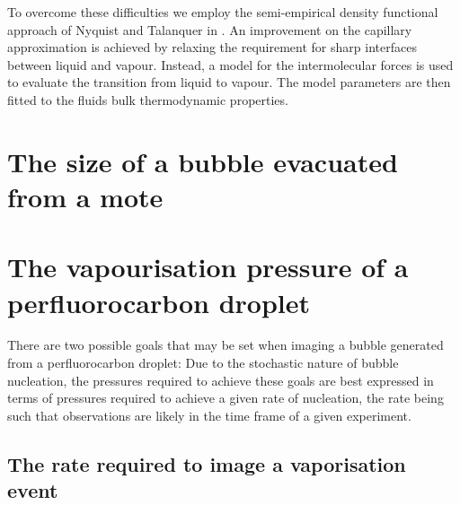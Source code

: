 To overcome these difficulties we employ the semi-empirical density functional approach of Nyquist\cite{Nyquist1995} and Talanquer\cite{Talanquer2001} in .
An improvement on the capillary approximation is achieved by  relaxing
the requirement for sharp interfaces between liquid and vapour.
Instead, a model for the intermolecular forces is used to evaluate the transition from liquid to vapour.
The model parameters are then fitted to the fluids bulk thermodynamic properties.



\section{The size of a bubble evacuated from a mote}\label{sec:nuc:evacuate}


\section{The vapourisation pressure of a perfluorocarbon droplet}\label{sec:nuc:vapourise}

There are two possible goals that may be set 
when imaging a bubble generated from a perfluorocarbon droplet:
Due to the stochastic nature of bubble nucleation, 
the pressures required to achieve these goals are best expressed in terms of pressures required
to achieve a given rate of nucleation,
the rate being such that observations are likely in the time frame of a given experiment.


\subsection{The rate required to image a vaporisation event}

